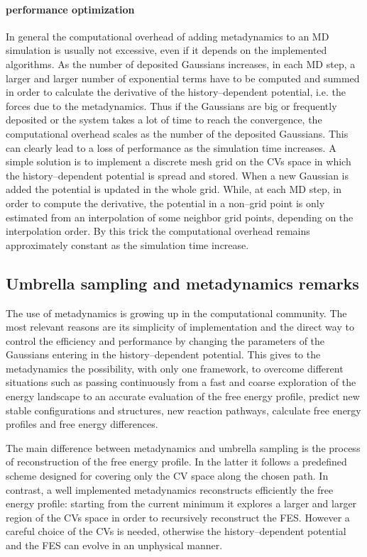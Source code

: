 \paragraph{\textbf{performance optimization}} In general the computational overhead of adding metadynamics to an
\ac{MD} simulation is usually not excessive, even if it depends on the implemented algorithms. As the
number of deposited Gaussians increases, in each \ac{MD} step, a larger and larger number of exponential terms
have to be computed and summed in order to calculate the derivative of the history--dependent potential, i.e. the
forces due to the metadynamics. Thus if the Gaussians are big or frequently deposited or the system takes a lot
of time to reach the convergence, the computational overhead scales as the number of the deposited Gaussians.
This can clearly lead to a loss of performance as the simulation time increases. A simple solution is to implement
a discrete mesh grid on the \acp{CV} space in which the history--dependent potential is spread and stored. When a
new Gaussian is added the potential is updated in the whole grid. While, at each \ac{MD} step, in order to
compute the derivative, the potential in a non--grid point is only estimated from an interpolation of some
neighbor grid points, depending on the interpolation order. By this trick the computational overhead remains
approximately constant as the simulation time increase.

\subsection{Umbrella sampling and metadynamics remarks}
The use of metadynamics is growing up in the computational community. The most relevant reasons are its
simplicity of implementation and the direct way to control the efficiency and performance by changing the
parameters of the Gaussians entering in the history--dependent potential. This gives to the metadynamics the
possibility, with only one framework, to overcome different situations such as passing continuously from a fast
and coarse exploration of the energy landscape to an accurate evaluation of the free energy profile, predict new
stable configurations and structures, new reaction pathways, calculate free energy profiles and free energy
differences.

The main difference between metadynamics and umbrella sampling is the process of reconstruction of the free
energy profile. In the latter it follows a predefined scheme designed for covering only the \ac{CV} space along
the chosen path. In contrast, a well implemented metadynamics reconstructs efficiently the free energy profile:
starting from the current minimum it explores a larger and larger region of the \acp{CV} space in order to
recursively reconstruct the \ac{FES}. However a careful choice of the \acp{CV} is needed, otherwise the
history--dependent potential and the \ac{FES} can evolve in an unphysical manner.

